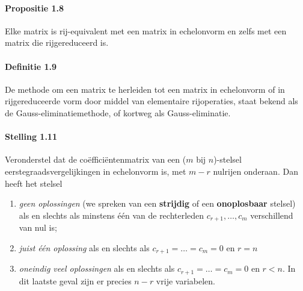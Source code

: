 \documentclass[11pt,oneside,a4paper]{article}
\begin{document}
	\paragraph{Propositie 1.8}
		Elke matrix is rij-equivalent met een matrix in echelonvorm en zelfs met een matrix die rijgereduceerd is.
	\paragraph{Definitie 1.9}
		De methode om een matrix te herleiden tot een matrix in echelonvorm of in rijgereduceerde vorm door middel van elementaire rijoperaties, staat bekend als de Gauss-eliminatiemethode, of kortweg als Gauss-eliminatie.
	\paragraph{Stelling 1.11}
		Veronderstel dat de coëfficiëntenmatrix van een ($m$ bij $n$)-stelsel eerstegraadsvergelijkingen in echelonvorm is,  met $m-r$ nulrijen onderaan.
		Dan heeft het stelsel
		\begin{enumerate}
			\item \textit{geen oplossingen} (we spreken van een \textbf{strijdig} of een \textbf{onoplosbaar} stelsel) als en slechts als minstens één van de rechterleden $c_{r+1}, \ldots , c_m$ verschillend van nul is;
			\item \textit{juist één oplossing} als en slechts als $c_{r+1} = \ldots = c_m = 0$ en $r = n$
			\item \textit{oneindig veel oplossingen} als en slechts als $c_{r+1} = \ldots = c_m = 0$ en $r < n$. In dit laatste geval zijn er precies $n-r$ vrije variabelen.
		\end{enumerate}
\end{document}
